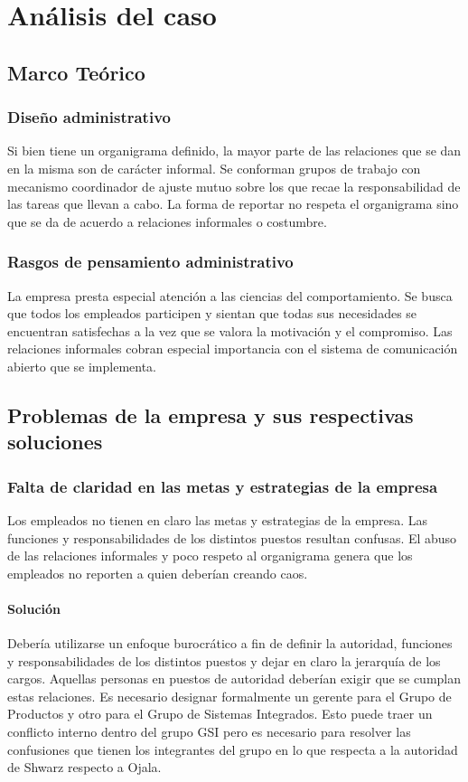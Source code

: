 \newpage
\section{An\'{a}lisis del caso}

	\subsection{Marco Te\'orico}

		\subsubsection{Dise\~{n}o administrativo}
			Si bien tiene un organigrama definido, la mayor parte de las relaciones que se dan en la misma son de car\'{a}cter informal. Se conforman grupos de trabajo con mecanismo coordinador de ajuste mutuo sobre los que recae la responsabilidad de las tareas que llevan a cabo. La forma de reportar no respeta el organigrama sino que se da de acuerdo a relaciones informales o costumbre.

		\subsubsection{Rasgos de pensamiento administrativo}
			La empresa presta especial atenci\'{o}n a las ciencias del comportamiento. Se busca que todos los empleados participen y sientan que todas sus necesidades se encuentran satisfechas a la vez que se valora la motivaci\'{o}n y el compromiso. Las relaciones informales cobran especial importancia con el sistema de comunicaci\'{o}n abierto que se implementa.

	\subsection{Problemas de la empresa y sus respectivas soluciones}


		\subsubsection{Falta de claridad en las metas y estrategias de la empresa}
			Los empleados no tienen en claro las metas y estrategias de la empresa. 
			Las funciones y responsabilidades de los distintos puestos resultan confusas.
			El abuso de las relaciones informales y poco respeto al organigrama genera que los empleados no reporten a quien deber\'{i}an creando caos. 
		\paragraph{Soluci\'on}
			Deber\'{i}a utilizarse un enfoque burocr\'{a}tico a fin de definir la autoridad, funciones y responsabilidades de los distintos puestos y dejar en claro la jerarqu\'{i}a de los cargos. 
			Aquellas personas en puestos de autoridad deber\'{i}an exigir que se cumplan estas relaciones. 
			Es necesario designar formalmente un gerente para el Grupo de Productos y otro para el Grupo de Sistemas Integrados. 
			Esto puede traer un conflicto interno dentro del grupo GSI  pero es necesario para resolver las confusiones que tienen los integrantes del grupo en lo que respecta a la autoridad de Shwarz respecto a Ojala.
		
